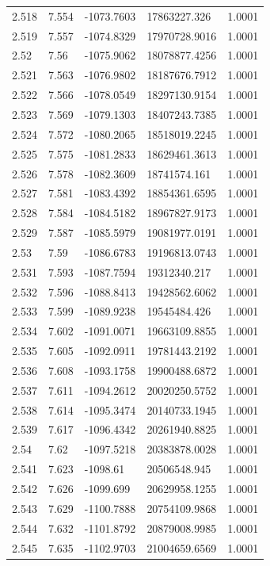 \begin{tabular}{lllll}
2.518 & 7.554 & -1073.7603 & 17863227.326 & 1.0001 \\
2.519 & 7.557 & -1074.8329 & 17970728.9016 & 1.0001 \\
2.52 & 7.56 & -1075.9062 & 18078877.4256 & 1.0001 \\
2.521 & 7.563 & -1076.9802 & 18187676.7912 & 1.0001 \\
2.522 & 7.566 & -1078.0549 & 18297130.9154 & 1.0001 \\
2.523 & 7.569 & -1079.1303 & 18407243.7385 & 1.0001 \\
2.524 & 7.572 & -1080.2065 & 18518019.2245 & 1.0001 \\
2.525 & 7.575 & -1081.2833 & 18629461.3613 & 1.0001 \\
2.526 & 7.578 & -1082.3609 & 18741574.161 & 1.0001 \\
2.527 & 7.581 & -1083.4392 & 18854361.6595 & 1.0001 \\
2.528 & 7.584 & -1084.5182 & 18967827.9173 & 1.0001 \\
2.529 & 7.587 & -1085.5979 & 19081977.0191 & 1.0001 \\
2.53 & 7.59 & -1086.6783 & 19196813.0743 & 1.0001 \\
2.531 & 7.593 & -1087.7594 & 19312340.217 & 1.0001 \\
2.532 & 7.596 & -1088.8413 & 19428562.6062 & 1.0001 \\
2.533 & 7.599 & -1089.9238 & 19545484.426 & 1.0001 \\
2.534 & 7.602 & -1091.0071 & 19663109.8855 & 1.0001 \\
2.535 & 7.605 & -1092.0911 & 19781443.2192 & 1.0001 \\
2.536 & 7.608 & -1093.1758 & 19900488.6872 & 1.0001 \\
2.537 & 7.611 & -1094.2612 & 20020250.5752 & 1.0001 \\
2.538 & 7.614 & -1095.3474 & 20140733.1945 & 1.0001 \\
2.539 & 7.617 & -1096.4342 & 20261940.8825 & 1.0001 \\
2.54 & 7.62 & -1097.5218 & 20383878.0028 & 1.0001 \\
2.541 & 7.623 & -1098.61 & 20506548.945 & 1.0001 \\
2.542 & 7.626 & -1099.699 & 20629958.1255 & 1.0001 \\
2.543 & 7.629 & -1100.7888 & 20754109.9868 & 1.0001 \\
2.544 & 7.632 & -1101.8792 & 20879008.9985 & 1.0001 \\
2.545 & 7.635 & -1102.9703 & 21004659.6569 & 1.0001 \\

\end{tabular}
